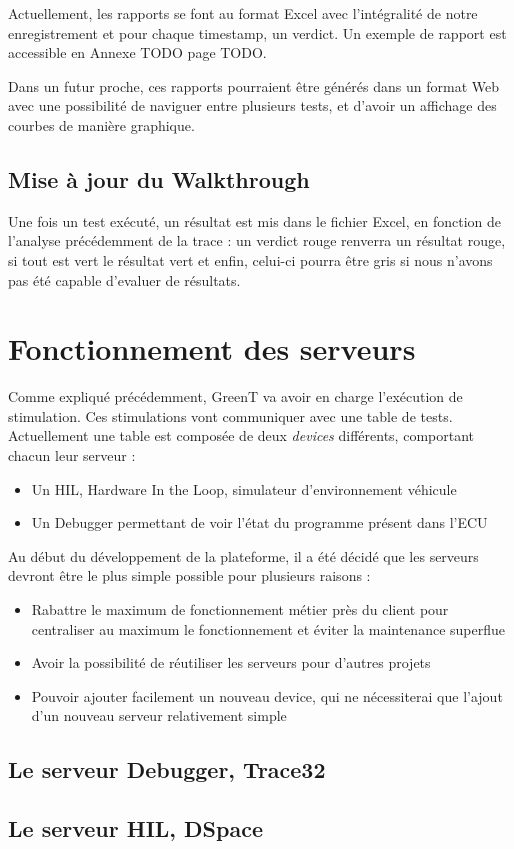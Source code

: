 	Actuellement, les rapports se font au format Excel avec l'intégralité de notre enregistrement et pour chaque timestamp, un verdict. Un
	exemple de rapport est accessible en Annexe TODO page TODO. 
	
	Dans un futur proche, ces rapports pourraient être générés dans un format Web avec une possibilité de naviguer entre plusieurs tests, et
	d'avoir un affichage des courbes de manière graphique.

	\subsection{Mise à jour du Walkthrough}
	Une fois un test exécuté, un résultat est mis dans le fichier Excel, en fonction de l'analyse précédemment de la trace : un verdict rouge renverra un résultat rouge, si tout est vert le résultat vert et enfin, celui-ci pourra être gris si nous n'avons pas été capable d'evaluer de résultats.


	\section{Fonctionnement des serveurs}
	Comme expliqué précédemment, GreenT va avoir en charge l'exécution de stimulation. Ces stimulations vont communiquer avec une table de
	tests. Actuellement une table est composée de deux \textit{devices} différents, comportant chacun leur serveur : 
	\begin{itemize}
		\item Un HIL, Hardware In the Loop, simulateur d'environnement véhicule
		\item Un Debugger permettant de voir l'état du programme présent dans l'ECU
	\end{itemize}

	Au début du développement de la plateforme, il a été décidé que les serveurs devront être le plus simple possible pour plusieurs raisons
	: 
	\begin{itemize}
		\item Rabattre le maximum de fonctionnement métier près du client pour centraliser au maximum le fonctionnement et éviter la
			maintenance superflue
		\item Avoir la possibilité de réutiliser les serveurs pour d'autres projets
		\item Pouvoir ajouter facilement un nouveau device, qui ne nécessiterai que l'ajout d'un nouveau serveur relativement simple
	\end{itemize}
	
	\subsection{Le serveur Debugger, Trace32}
	\subsection{Le serveur HIL, DSpace}

	
